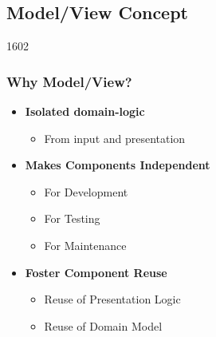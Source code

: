 %
%
%
%

\subsection{Model/View Concept}


\begin{slide}{1602}\frametitle{Why Model/View?}
  \begin{itemize}
  \item \textbf{Isolated domain-logic}
    \begin{itemize}
    \item From input and presentation
    \end{itemize}
  \item \textbf{Makes Components Independent}
    \begin{itemize}
    \item For Development
    \item For Testing
    \item For Maintenance
    \end{itemize}
  \item \textbf{Foster Component Reuse}
    \begin{itemize}
    \item Reuse of Presentation Logic
    \item Reuse of Domain Model
    \end{itemize}
  \end{itemize}
\end{slide}

